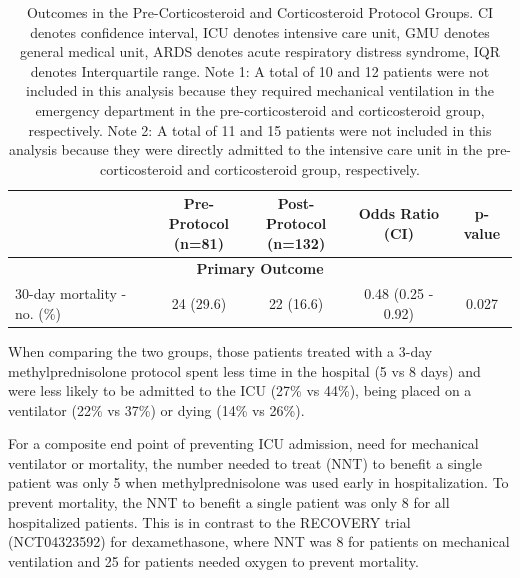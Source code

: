 \begin{table}
\footnotesize
\caption{Outcomes in the Pre-Corticosteroid and Corticosteroid Protocol Groups. CI denotes confidence interval, ICU denotes intensive care unit, GMU denotes general medical unit, ARDS denotes acute respiratory distress syndrome, IQR denotes Interquartile range. Note 1: A total of 10 and 12 patients were not included in this analysis because they required mechanical ventilation in the emergency department in the pre-corticosteroid and corticosteroid group, respectively. Note 2: A total of 11 and 15 patients were not included in this analysis because they were directly admitted to the intensive care unit in the pre-corticosteroid and corticosteroid group, respectively.}
\begin{center}
\begin{tabular}{p{6.5cm} cccc}
\hline
&\makecell{\textbf{Pre-Protocol}\\ \textbf{(n=81)}}	&\makecell{\textbf{Post-Protocol}\\ \textbf{(n=132)}}	&\textbf{Odds Ratio (CI)}	& \textbf{p-value}\\
\hline
\multicolumn{5}{c}{\textbf{Primary Outcome }}\\
\hline
30-day mortality - no. (\%)	& 24 (29.6)	& 22 (16.6)	&0.48 (0.25 - 0.92)	&0.027\\

\hline
\end{tabular}
\end{center}
\label{endpoints}
\end{table}%


When comparing the two groups, those patients treated with a 3-day methylprednisolone protocol spent less time in the hospital (5 vs 8 days) and were less likely to be admitted to the ICU (27\% vs 44\%), being placed on a ventilator (22\% vs 37\%) or dying (14\% vs 26\%).

For a composite end point of preventing ICU admission, need for mechanical ventilator or mortality, the number needed to treat (NNT) to benefit a single patient was only 5 when methylprednisolone was used early in hospitalization. To prevent mortality, the NNT to benefit a single patient was only 8 for all hospitalized patients. This is in contrast to the RECOVERY trial (NCT04323592) for dexamethasone, where NNT was 8 for patients on mechanical ventilation and 25 for patients needed oxygen to prevent mortality.
\color{black}

